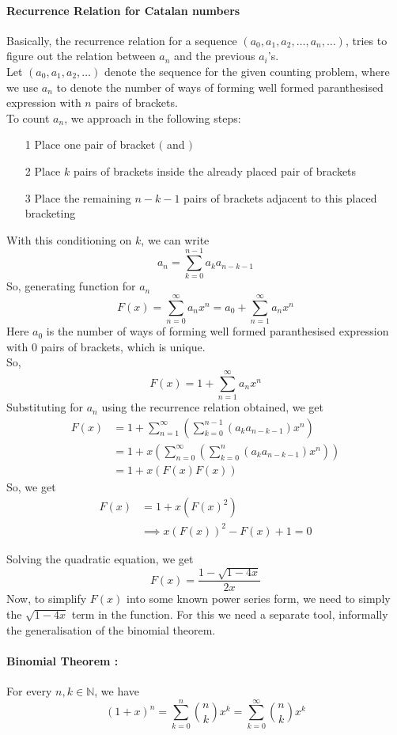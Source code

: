 \paragraph{Recurrence Relation for Catalan numbers}
Basically, the recurrence relation for a sequence $(a_0,a_1,a_2,\dots,a_n,\dots)$, tries to figure out the relation between $a_n$ and the previous $a_i$'s.\\
Let $(a_0,a_1,a_2,\dots)$ denote the sequence for the given counting problem, where we use $a_n$ to denote the number of ways of forming well formed paranthesised expression with $n$ pairs of brackets.\\
To count $a_n$, we approach in the following steps:
\begin{itemize}
    \item[1] Place one pair of bracket $($ and $)$
    \item[2] Place $k$ pairs of brackets inside the already placed pair of brackets
    \item[3] Place the remaining $n-k-1$ pairs of brackets adjacent to this placed bracketing
\end{itemize}
With this conditioning on $k$, we can write 
$$a_n=\sum_{k=0}^{n-1}a_k a_{n-k-1}$$
So, generating function for $a_n$
$$F(x)=\sum_{n=0}^\infty a_n x^n=a_0+\sum_{n=1}^\infty a_n x^n$$
Here $a_0$ is the  number of ways of forming well formed paranthesised expression with 0 pairs of brackets, which is unique.
\\ So, $$F(x)=1+\sum_{n=1}^\infty a_n x^n$$
Substituting for $a_n$ using the recurrence relation obtained, we get
\begin{align*}
    F(x) & = 1+\sum_{n=1}^\infty\left(\sum_{k=0}^{n-1} (a_k a_{n-k-1})x^n\right)\\
    &= 1+x\left(\sum_{n=0}^\infty\left(\sum_{k=0}^n (a_k a_{n-k-1})x^n\right)\right)\\
    & =1+x(F(x)F(x))
\end{align*}
So, we get
\begin{align}
    F(x)&=1+x(F(x)^2) \nonumber \\
    & \implies x(F(x))^2-F(x)+1=0
\end{align}

Solving the quadratic equation, we get
$$F(x)=\frac{1-\sqrt{1-4x}}{2x}$$
Now, to simplify  $F(x)$ into some known power series form, we need to simply the $\sqrt{1-4x}$ term in the function. For this we need a separate tool, informally the generalisation of the binomial theorem.

\paragraph{Binomial Theorem :} For every $n,k \in \mathbb{N}$, we have 
$$(1+x)^n=\sum_{k=0}^n {n \choose k}x^k= \sum_{k=0}^\infty {n \choose k}x^k $$

